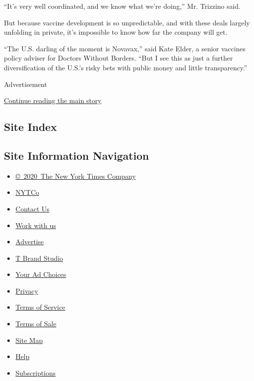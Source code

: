 ``It's very well coordinated, and we know what we're doing,'' Mr.
Trizzino said.

But because vaccine development is so unpredictable, and with these
deals largely unfolding in private, it's impossible to know how far the
company will get.

``The U.S. darling of the moment is Novavax,'' said Kate Elder, a senior
vaccines policy adviser for Doctors Without Borders. ``But I see this as
just a further diversification of the U.S.'s risky bets with public
money and little transparency.''

Advertisement

\protect\hyperlink{after-bottom}{Continue reading the main story}

\hypertarget{site-index}{%
\subsection{Site Index}\label{site-index}}

\hypertarget{site-information-navigation}{%
\subsection{Site Information
Navigation}\label{site-information-navigation}}

\begin{itemize}
\tightlist
\item
  \href{https://help.nytimes3xbfgragh.onion/hc/en-us/articles/115014792127-Copyright-notice}{©~2020~The
  New York Times Company}
\end{itemize}

\begin{itemize}
\tightlist
\item
  \href{https://www.nytco.com/}{NYTCo}
\item
  \href{https://help.nytimes3xbfgragh.onion/hc/en-us/articles/115015385887-Contact-Us}{Contact
  Us}
\item
  \href{https://www.nytco.com/careers/}{Work with us}
\item
  \href{https://nytmediakit.com/}{Advertise}
\item
  \href{http://www.tbrandstudio.com/}{T Brand Studio}
\item
  \href{https://www.nytimes3xbfgragh.onion/privacy/cookie-policy\#how-do-i-manage-trackers}{Your
  Ad Choices}
\item
  \href{https://www.nytimes3xbfgragh.onion/privacy}{Privacy}
\item
  \href{https://help.nytimes3xbfgragh.onion/hc/en-us/articles/115014893428-Terms-of-service}{Terms
  of Service}
\item
  \href{https://help.nytimes3xbfgragh.onion/hc/en-us/articles/115014893968-Terms-of-sale}{Terms
  of Sale}
\item
  \href{https://spiderbites.nytimes3xbfgragh.onion}{Site Map}
\item
  \href{https://help.nytimes3xbfgragh.onion/hc/en-us}{Help}
\item
  \href{https://www.nytimes3xbfgragh.onion/subscription?campaignId=37WXW}{Subscriptions}
\end{itemize}
